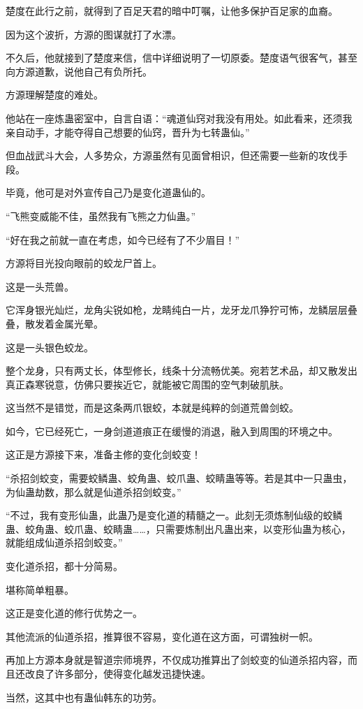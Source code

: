 \begin{this_body}
楚度在此行之前，就得到了百足天君的暗中叮嘱，让他多保护百足家的血裔。

因为这个波折，方源的图谋就打了水漂。

不久后，他就接到了楚度来信，信中详细说明了一切原委。楚度语气很客气，甚至向方源道歉，说他自己有负所托。

方源理解楚度的难处。

他站在一座炼蛊密室中，自言自语：“魂道仙窍对我没有用处。如此看来，还须我亲自动手，才能夺得自己想要的仙窍，晋升为七转蛊仙。”

但血战武斗大会，人多势众，方源虽然有见面曾相识，但还需要一些新的攻伐手段。

毕竟，他可是对外宣传自己乃是变化道蛊仙的。

“飞熊变威能不佳，虽然我有飞熊之力仙蛊。”

“好在我之前就一直在考虑，如今已经有了不少眉目！”

方源将目光投向眼前的蛟龙尸首上。

这是一头荒兽。

它浑身银光灿烂，龙角尖锐如枪，龙睛纯白一片，龙牙龙爪狰狞可怖，龙鳞层层叠叠，散发着金属光晕。

这是一头银色蛟龙。

整个龙身，只有两丈长，体型修长，线条十分流畅优美。宛若艺术品，却又散发出真正森寒锐意，仿佛只要挨近它，就能被它周围的空气刺破肌肤。

这当然不是错觉，而是这条两爪银蛟，本就是纯粹的剑道荒兽剑蛟。

如今，它已经死亡，一身剑道道痕正在缓慢的消退，融入到周围的环境之中。

这正是方源接下来，准备主修的变化剑蛟变！

“杀招剑蛟变，需要蛟鳞蛊、蛟角蛊、蛟爪蛊、蛟睛蛊等等。若是其中一只蛊虫，为仙蛊劫数，那么就是仙道杀招剑蛟变。”

“不过，我有变形仙蛊，此蛊乃是变化道的精髓之一。此刻无须炼制仙级的蛟鳞蛊、蛟角蛊、蛟爪蛊、蛟睛蛊……，只需要炼制出凡蛊出来，以变形仙蛊为核心，就能组成仙道杀招剑蛟变。”

变化道杀招，都十分简易。

堪称简单粗暴。

这正是变化道的修行优势之一。

其他流派的仙道杀招，推算很不容易，变化道在这方面，可谓独树一帜。

再加上方源本身就是智道宗师境界，不仅成功推算出了剑蛟变的仙道杀招内容，而且还改良了许多部分，使得变化越发迅捷快速。

当然，这其中也有蛊仙韩东的功劳。


\end{this_body}
